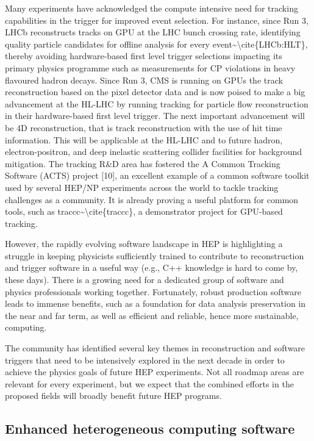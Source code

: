 Many experiments have acknowledged the compute intensive need for
tracking capabilities in the trigger for improved event selection. For
instance, since Run 3, LHCb reconstructs tracks on GPU at the LHC bunch
crossing rate, identifying quality particle candidates for offline
analysis for every event\textasciitilde\textbackslash cite\{LHCb:HLT\},
thereby avoiding hardware-based first level trigger selections impacting
its primary physics programme such as measurements for CP violations in
heavy flavoured hadron decays. Since Run 3, CMS is running on GPUs the
track reconstruction based on the pixel detector data and is now poised
to make a big advancement at the HL-LHC by running tracking for particle
flow reconstruction in their hardware-based first level trigger. The
next important advancement will be 4D reconstruction, that is track
reconstruction with the use of hit time information. This will be
applicable at the HL-LHC and to future hadron, electron-positron, and
deep inelastic scattering collider facilities for background mitigation.
The tracking R\&D area has fostered the A Common Tracking Software
(ACTS) project {[}10{]}, an excellent example of a common software
toolkit used by several HEP/NP experiments across the world to tackle
tracking challenges as a community. It is already proving a useful
platform for common tools, such as
traccc\textasciitilde\textbackslash cite\{traccc\}, a demonstrator
project for GPU-based tracking.

However, the rapidly evolving software landscape in HEP is highlighting
a struggle in keeping physicists sufficiently trained to contribute to
reconstruction and trigger software in a useful way (e.g., C++ knowledge
is hard to come by, these days). There is a growing need for a dedicated
group of software and physics professionals working together.
Fortunately, robust production software leads to immense benefits, such
as a foundation for data analysis preservation in the near and far term,
as well as efficient and reliable, hence more sustainable, computing.

The community has identified several key themes in reconstruction and
software triggers that need to be intensively explored in the next
decade in order to achieve the physics goals of future HEP experiments.
Not all roadmap areas are relevant for every experiment, but we expect
that the combined efforts in the proposed fields will broadly benefit
future HEP programs.

\subsection{Enhanced heterogeneous computing
software}\label{enhanced-heterogeneous-computing-software}


